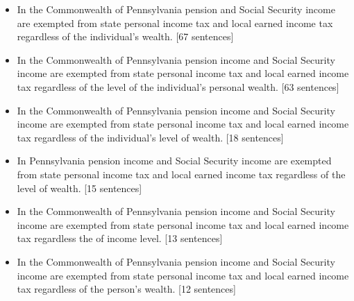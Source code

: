 \documentclass[letterpaper]{article}
\begin{document}
\begin{itemize}
\item In the Commonwealth of Pennsylvania pension and Social Security income are exempted from state personal income tax and local earned income tax regardless of the individual's wealth. [67 sentences]
\item In the Commonwealth of Pennsylvania pension income and Social Security income are exempted from state personal income tax and local earned income tax regardless of the level of the individual’s personal wealth. [63 sentences]
\item In the Commonwealth of Pennsylvania pension income and Social Security income are exempted from state personal income tax and local earned income tax regardless of the individual's level of wealth. [18 sentences]
\item In Pennsylvania pension income and Social Security income are exempted from state personal income tax and local earned income tax regardless of the level of wealth. [15 sentences]
\item In the Commonwealth of Pennsylvania pension income and Social Security income are exempted from state personal income tax and local earned income tax regardless the of income level. [13 sentences]
\item In the Commonwealth of Pennsylvania pension income and Social Security income are exempted from state personal income tax and local earned income tax regardless of the person's wealth. [12 sentences]
\end{itemize}


\end{document}
